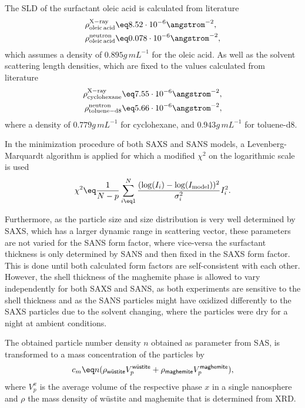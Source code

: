 \documentclass[\main/dresen_thesis.tex]{subfiles}
\begin{document}
    The SLD of the surfactant oleic acid is calculated from literature
    \begin{align}
      \rho^\mathrm{X-ray}_\mathrm{oleic\,acid} &\eq 8.52 \cdot 10^{-6} \angstrom^{-2},\\
      \rho^\mathrm{neutron}_\mathrm{oleic\,acid} &\eq 0.078 \cdot 10^{-6} \angstrom^{-2},
    \end{align}
    which assumes a density of $0.895 \unit{g\,mL^{-1}}$ for the oleic acid.
    As well as the solvent scattering length densities, which are fixed to the values calculated from literature
    \begin{align}
      \rho^\mathrm{X-ray}_{\mathrm{cyclohexane}} &\eq 7.55 \cdot 10^{-6} \angstrom^{-2},\\
      \rho^\mathrm{neutron}_\mathrm{toluene-d8}  &\eq 5.66 \cdot 10^{-6} \angstrom^{-2},
    \end{align}
    where a density of $0.779 \unit{g\,mL^{-1}}$ for cyclohexane, and $0.943 \unit{g\,mL^{-1}}$ for toluene-d8.

    In the minimization procedure of both SAXS and SANS models, a Levenberg-Marquardt algorithm\cite{Marquardt_1963_Analgo, Oliphant_2006_Guide} is applied for which a modified $\chi^2$ on the logarithmic scale is used
    \begin{align}
      \chi^2 \eq \frac{1}{N-p} \sum_{i\eq 1}^{N} \frac{(\log(I_i) - \log(I_\mathrm{model}))^2}{\sigma_i^2} I^2_i.
    \end{align}

    Furthermore, as the particle size and size distribution is very well determined by SAXS, which has a larger dynamic range in scattering vector, these parameters are not varied for the SANS form factor, where vice-versa the surfactant thickness is only determined by SANS and then fixed in the SAXS form factor.
    This is done until both calculated form factors are self-consistent with each other.
    However, the shell thickness of the maghemite phase is allowed to vary independently for both SAXS and SANS, as both experiments are sensitive to the shell thickness and as the SANS particles might have oxidized differently to the SAXS particles due to the solvent changing, where the particles were dry for a night at ambient conditions.

    The obtained particle number density $n$ obtained as parameter from SAS, is transformed to a mass concentration of the particles by
    \begin{align}
      c_m \eq n (\rho_\textsf{w\"ustite} V_p^\textsf{w\"ustite} + \rho_\textsf{maghemite} V_p^\textsf{maghemite}),
    \end{align}
    where $V^x_p$ is the average volume of the respective phase $x$ in a single nanosphere and $\rho$ the mass density of w\"ustite and maghemite that is determined from XRD.
\end{document}
